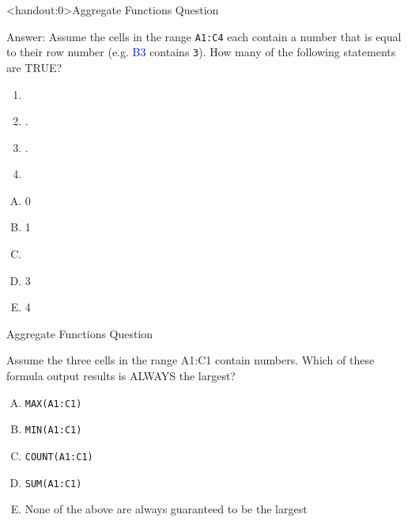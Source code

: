 \documentclass[xcolor=svgnames]{beamer}
\newcommand{\blue}[1]{{\textcolor{blue}{#1}}}
\begin{document}
\begin{frame}<handout:0>{Aggregate Functions Question}
  \begin{block}{Answer:}
Assume the cells in the range {\tt A1:C4} each contain a number that is equal to their row number (e.g. \blue{B3} contains {\tt 3}). How many of the following statements are TRUE?
\begin{enumerate}
\item {}
\item {.}
\item {.}
\item {} 
\end{enumerate}
\begin{multicols}{5}
\begin{enumerate}[A)]
\item 0 
\item 1
\item \textbf<6>{\textit<6>{{}}}
\item 3
\item 4
\end{enumerate}
\end{multicols}
  \end{block} 
\end{frame}




\begin{frame}{Aggregate Functions Question}
  \begin{example}
Assume the three cells in the range A1:C1 contain numbers.  Which of these formula output results is ALWAYS the largest?
\begin{enumerate}[A)]
\item {\tt MAX(A1:C1)}
\item {\tt MIN(A1:C1)}
\item {\tt COUNT(A1:C1)}
\item {\tt SUM(A1:C1)}
\item {None of the above are always guaranteed to be the largest}
\end{enumerate}
 \end{example} 
\end{frame}
\end{document}
